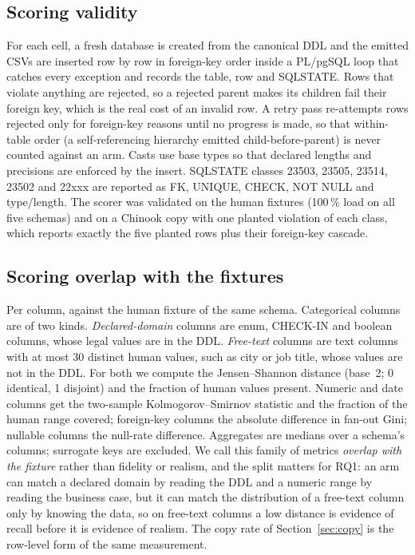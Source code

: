 \documentclass[preprint,12pt]{elsarticle}
\begin{document}
\subsection{Scoring validity}
\label{sec:scorer}
For each cell, a fresh database is created from the canonical DDL and the emitted CSVs are inserted row by row in foreign-key order inside a PL/pgSQL loop that catches every exception and records the table, row and SQLSTATE. Rows that violate anything are rejected, so a rejected parent makes its children fail their foreign key, which is the real cost of an invalid row. A retry pass re-attempts rows rejected only for foreign-key reasons until no progress is made, so that within-table order (a self-referencing hierarchy emitted child-before-parent) is never counted against an arm. Casts use base types so that declared lengths and precisions are enforced by the insert. SQLSTATE classes 23503, 23505, 23514, 23502 and 22xxx are reported as FK, UNIQUE, CHECK, NOT NULL and type/length. The scorer was validated on the human fixtures (100\,\% load on all five schemas) and on a Chinook copy with one planted violation of each class, which reports exactly the five planted rows plus their foreign-key cascade.

\subsection{Scoring overlap with the fixtures}
\label{sec:fidmetrics}
Per column, against the human fixture of the same schema. Categorical columns are of two kinds. \emph{Declared-domain} columns are enum, CHECK-IN and boolean columns, whose legal values are in the DDL. \emph{Free-text} columns are text columns with at most 30 distinct human values, such as city or job title, whose values are not in the DDL. For both we compute the Jensen--Shannon distance (base~2; 0 identical, 1 disjoint) and the fraction of human values present. Numeric and date columns get the two-sample Kolmogorov--Smirnov statistic and the fraction of the human range covered; foreign-key columns the absolute difference in fan-out Gini; nullable columns the null-rate difference. Aggregates are medians over a schema's columns; surrogate keys are excluded. We call this family of metrics \emph{overlap with the fixture} rather than fidelity or realism, and the split matters for RQ1: an arm can match a declared domain by reading the DDL and a numeric range by reading the business case, but it can match the distribution of a free-text column only by knowing the data, so on free-text columns a low distance is evidence of recall before it is evidence of realism. The copy rate of Section~\ref{sec:copy} is the row-level form of the same measurement.
\end{document}
